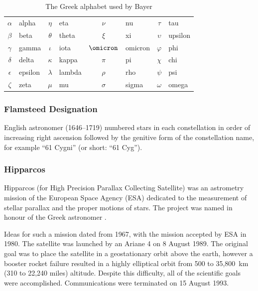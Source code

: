 \begin{table}[htb]
  \centering
  \begin{tabular}{>{$}c<{$}l>{$}c<{$}l>{$}c<{$}l>{$}c<{$}l}
    \toprule
    \alpha    & alpha   &  \eta      & eta     & \nu       & nu       & \tau     & tau     \\ 
    \beta     & beta    &  \theta    & theta   & \xi       & xi       & \upsilon & upsilon \\ 
    \gamma    & gamma   &  \iota     & iota    & \omicron  & omicron  & \varphi  & phi     \\ 
    \delta    & delta   &  \kappa    & kappa   & \pi       & pi       & \chi     & chi     \\ 
    \epsilon  & epsilon &  \lambda   & lambda  & \rho     & rho       & \psi     & psi     \\ 
    \zeta     & zeta    &  \mu       & mu      & \sigma   & sigma     & \omega   & omega   \\
    \bottomrule
 \end{tabular}
  \caption{The Greek alphabet used by Bayer}
  \label{tab:Phenomena:StarNames:BayerLetters}
\end{table}

\subsubsection{Flamsteed Designation}
\label{sec:Phenomena:StarNames:Flamsteed}

English astronomer  (1646--1719) numbered stars in each
constellation in order of increasing right ascension followed by the genitive
form of the constellation name, for example ``61 Cygni'' (or short: ``61 Cyg'').

\subsubsection{Hipparcos}
\label{sec:Phenomena:StarNames:Hipparcos}

Hipparcos (for High Precision Parallax Collecting Satellite) was an
astrometry mission of the European Space Agency (ESA) dedicated to the
measurement of stellar parallax and the proper motions of stars. The
project was named in honour of the Greek astronomer .

Ideas for such a mission dated from 1967, with the mission accepted by
ESA in 1980. The satellite was launched by an Ariane 4 on 8 August 1989.
The original goal was to place the satellite in a geostationary orbit
above the earth, however a booster rocket failure resulted in a highly
elliptical orbit from 500 to 35,800~km (310 to 22,240 miles) altitude. Despite this
difficulty, all of the scientific goals were accomplished.
Communications were terminated on 15 August 1993.

